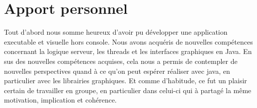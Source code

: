 \documentclass[a4paper,12pt]{report}
\begin{document}
    \section{Apport personnel}
      Tout d'abord nous somme heureux d'avoir pu développer une application executable et visuelle hors console.
      \medbreak
      Nous avons acquéris de nouvelles compétences concernant la logique serveur, les threads et les interfaces graphiques en Java.
      \medbreak
      En sus des nouvelles compétences acquises,  cela nous a permis de contempler de nouvelles perspectives quand à ce qu'on peut espérer réaliser  avec java, en particulier avec les librairies graphiques.
      \medbreak
      Et comme d'habitude, ce fut un plaisir certain de travailler en groupe, en particulier dans celui-ci qui à partagé la même motivation, implication et cohérence.
\end{document}
